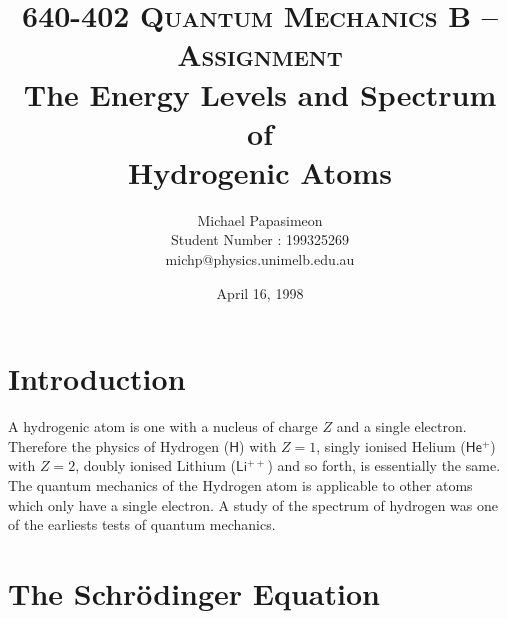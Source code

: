 \documentclass[a4paper]{serif}
\title{ \large{ \textsc{640-402 Quantum Mechanics B -- Assignment } }\\[1mm]
       \huge{{\bf \sffamily The Energy Levels and Spectrum of \\ Hydrogenic Atoms}} }
\author{ Michael Papasimeon \\
        Student Number : 199325269 \\
		michp@physics.unimelb.edu.au }
\date{April 16, 1998}
\begin{document}
\maketitle


\tableofcontents
\newpage


\setcounter{page}{1}

\section{Introduction}
    A hydrogenic atom is one with a nucleus of charge $Z$ and a single electron. 
    Therefore the physics of Hydrogen ($\mathsf{H}$) with $Z = 1$, singly ionised 
    Helium ($\mathsf{He^+}$) with $Z = 2$, doubly ionised Lithium ($\mathsf{Li^{++}}$) 
    and so forth, is essentially the same. The quantum mechanics of the Hydrogen atom 
    is applicable to other atoms which only have a single electron. A study of the
    spectrum of hydrogen was one of the earliests tests of quantum mechanics.

\section{The Schr\"odinger Equation}
\end{document}

